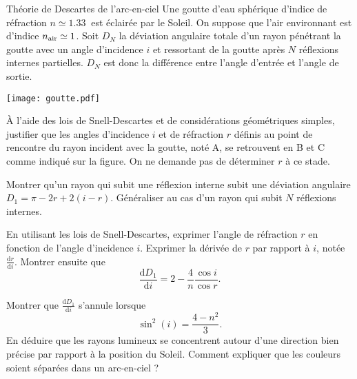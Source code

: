 \begin{exo}[MPSI][1][colle]{Théorie de Descartes de l'arc-en-ciel}
Une goutte d'eau sphérique d'indice de réfraction $n\simeq\SI{1.33}{}$ est éclairée par le Soleil. On suppose que l'air environnant est d'indice $n_{\rm air}\simeq1$. Soit $D_N$ la déviation angulaire totale d'un rayon pénétrant la goutte avec un angle d'incidence $i$ et ressortant de la goutte après $N$ réflexions internes partielles. $D_N$ est donc la différence entre l'angle d'entrée et l'angle de sortie.

\begin{center}
\texttt{[image: goutte.pdf]}
\end{center}

\begin{questions}
	\item À l'aide des lois de Snell-Descartes et de considérations géométriques simples, justifier que les angles d'incidence $i$ et de réfraction $r$ définis au point de rencontre du rayon incident avec la goutte, noté A, se retrouvent en B et C comme indiqué sur la figure. On ne demande pas de déterminer $r$ à ce stade.

	\item Montrer qu'un rayon qui subit une réflexion interne subit une déviation angulaire $D_1=\pi-2r+2(i-r)$.   Généraliser au cas d'un rayon qui subit $N$ réflexions internes.


	\item En utilisant les lois de Snell-Descartes, exprimer l'angle de réfraction $r$ en fonction de l'angle d'incidence $i$. Exprimer la dérivée de $r$ par rapport à $i$, notée $\frac{\mathrm{d} r}{\mathrm{d} i}$. Montrer ensuite que
	$$
	\frac{\mathrm{d} D_1}{\mathrm{d} i} = 2-\frac{4}{n} \frac{\cos i}{\cos r}.
	$$


	\item Montrer que $\frac{\mathrm{d} D_1}{\mathrm{d} i}$ s’annule lorsque
	$$
	\sin^2(i) = \frac{4-n^2}{3}.
	$$
	En déduire que les rayons lumineux se concentrent autour d’une direction bien précise par rapport à la position du Soleil. Comment expliquer que les couleurs soient séparées dans un arc-en-ciel ?

\end{questions}
\end{exo}

